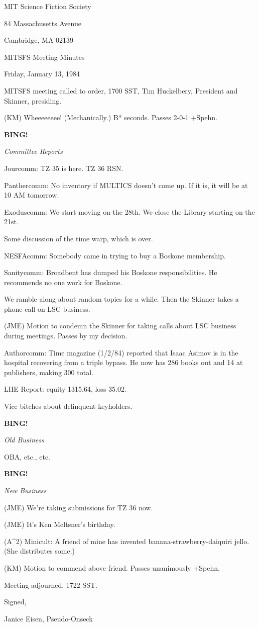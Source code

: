 \documentclass[12pt]{article}
\newcommand{\bing}{{\bf BING!} }
\newcommand{\goto}[1]{\bing \vskip 12pt \centerline{{\em{#1}}}}
\begin{document}
\begin{center}

MIT Science Fiction Society 

84 Massachusetts Avenue

Cambridge, MA 02139

\vspace{12pt}

MITSFS Meeting Minutes 

Friday, January 13, 1984

\end{center}
 
\vspace{18pt}

\setlength{\parskip}{6pt}

\noindent
MITSFS meeting called to order, 1700 SST,
Tim Huckelbery, President and Skinner, presiding.

(KM) Wheeeeeeee! (Mechanically.) B* seconds. Passes 2-0-1 +Spehn.

\goto{Committee Reports}

Jourcomm: TZ 35 is here. TZ 36 RSN.

Panthercomm: No inventory if MULTICS doesn't come up. If it is, it will be at 10 AM tomorrow.

Exoduscomm: We start moving on the 28th. We close the Library starting on the 21st.

Some discussion of the time warp, which is over.

NESFAcomm: Somebody came in trying to buy a Boskone membership.

Sanitycomm: Broadbent has dumped his Boskone responsibilities. He recommends no one work for Boskone.

We ramble along about random topics for a while. Then the Skinner takes a phone call on LSC business.

(JME) Motion to condemn the Skinner for taking calls about LSC business during meetings. Passes by my decision.

Authorcomm: Time magazine (1/2/84) reported that Isaac Asimov is in the hospital recovering from a triple bypass. He now has 286 books out and 14 at publishers, making 300 total.

LHE Report: equity 1315.64, loss 35.02.

Vice bitches about delinquent keyholders.

\goto{Old Business}

OBA, etc., etc.

\goto{New Business}

(JME) We're taking submissions for TZ 36 now.

(JME) It's Ken Meltsner's birthday.

(A^2) Minicult: A friend of mine has invented banana-strawberry-daiquiri jello. (She distributes some.)

(KM) Motion to commend above friend. Passes unanimously +Spehn.

\vspace{12pt}

\noindent
Meeting adjourned, 1722 SST.

\vspace{18pt}

\centerline{Signed,}
\centerline{Janice Eisen, Pseudo-Onseck}
\end{document}
